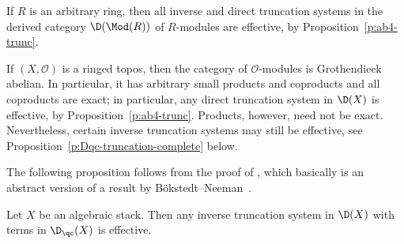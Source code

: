 \begin{example}
  \label{ex:modules-effective}
  If $R$ is an arbitrary ring, then all 
  inverse and direct truncation systems in the derived category
  $\D(\Mod(R))$ of $R$-modules are effective, by 
  Proposition~\ref{p:ab4-trunc}.
\end{example}

\begin{example}
  \label{ex:ringed-topos-effective}
  If $(X, \mathcal{O})$ is a ringed topos,
  then the category of $\mathcal{O}$-modules is Grothendieck
  abelian. 
  In particular, it has arbitrary small products and coproducts and
  all coproducts are exact;
  in particular, any direct truncation system in $\D(X)$ is
  effective, by Proposition~\ref{p:ab4-trunc}. 
  Products, however, need not be exact.
  Nevertheless, certain inverse truncation systems may still be
  effective, see Proposition~\ref{p:Dqc-truncation-complete} below.
\end{example}


The following proposition follows from the proof of
\cite[]{stacks-project},
which basically is an abstract version of a result by Bökstedt--Neeman~\cite[Lemma~5.3]{neeman-homotopy-limits}.

\begin{proposition}
  \label{p:Dqc-truncation-complete}
  Let $X$ be an algebraic stack.
  Then any inverse truncation system in $\D(X)$ with terms in
  $\D_\qc(X)$ is effective. 
\end{proposition}

